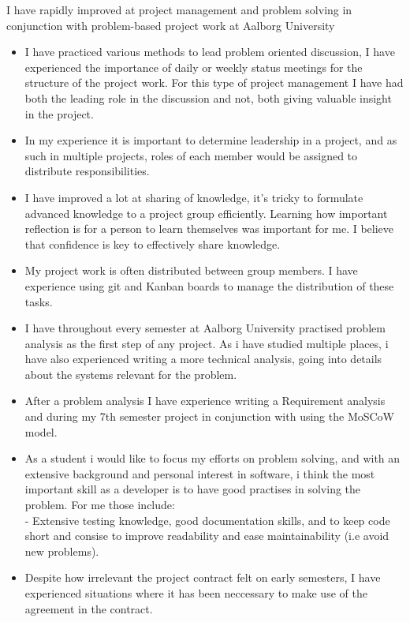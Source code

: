 \documentclass[a4paper, 14pt]{article}
\newcommand{\myitem}{\item[\color{red}\#]}
\newcommand{\highlight}[1]{\color{orange}#1\color{black}\vspace{.5pt}}
\begin{document}
    \noindent I have rapidly improved at project management and problem solving in conjunction with problem-based project work at Aalborg University
    \begin{itemize}
        \myitem{} I have practiced various methods to lead problem oriented discussion, I have experienced the importance of daily or weekly status meetings for the structure of the project work. For this type of project management I have had both the leading role in the discussion and not, both giving valuable insight in the project.
        \myitem{} In my experience it is important to determine leadership in a project, and as such in multiple projects, roles of each member would be assigned to distribute responsibilities.
        \myitem{} I have improved a lot at sharing of knowledge, it's tricky to formulate advanced knowledge to a project group efficiently. Learning how important reflection is for a person to learn themselves was important for me. I believe that confidence is key to effectively share knowledge.
        \myitem{} My project work is often distributed between group members. I have experience using \highlight{git} and \highlight{Kanban boards} to manage the distribution of these tasks.
    \end{itemize}
    \begin{itemize}
        \myitem{} I have throughout every semester at Aalborg University practised \highlight{problem analysis} as the first step of any project. As i have studied multiple places, i have also experienced writing a more technical analysis, going into details about the systems relevant for the problem.
        \myitem{} After a problem analysis I have experience writing a \highlight{Requirement analysis} and during my 7th semester project in conjunction with using the MoSCoW model.
        \myitem{} As a student i would like to focus my efforts on problem solving, and with an extensive background and personal interest in software, i think the most important skill as a developer is to have good practises in solving the problem. For me those include:\\
        -         Extensive testing knowledge, good documentation skills, and to keep code short and consise to improve readability and ease maintainability (i.e avoid new problems).
        \myitem{} Despite how irrelevant the project contract felt on early semesters, I have experienced situations where it has been neccessary to make use of the agreement in the contract.
    \end{itemize}
\end{document}
